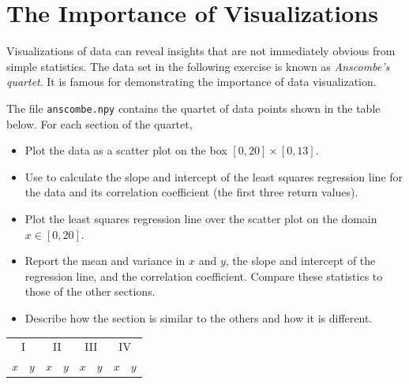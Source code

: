 \label{lab:DataVis}

\section*{The Importance of Visualizations} %

Visualizations of data can reveal insights that are not immediately obvious from simple statistics.
The data set in the following exercise is known as \emph{Anscombe's quartet}.
It is famous for demonstrating the importance of data visualization.

\begin{problem} %
The file \texttt{anscombe.npy} contains the quartet of data points shown in the table below.
For each section of the quartet,
\begin{itemize}
	\setlength\itemsep{0em}
	\item Plot the data as a scatter plot on the box $[0,20]\times[0,13]$.
    \item Use  to calculate the slope and intercept of the least squares regression line for the data and its correlation coefficient (the first three return values).
	\item Plot the least squares regression line over the scatter plot on the domain $x \in [0,20]$.
	\item Report the mean and variance in $x$ and $y$, the slope and intercept of the regression line, and the correlation coefficient.
    Compare these statistics to those of the other sections.
	\item Describe how the section is similar to the others and how it is different.
\end{itemize}
\begin{table}[H]
\scriptsize{
\begin{tabular}{rr|rr|rr|rr}
    \multicolumn{2}{c|}{I}    & \multicolumn{2}{|c|}{II} &
    \multicolumn{2}{|c|}{III} & \multicolumn{2}{|c}{IV} \\
    \multicolumn{1}{c}{$x$}   & \multicolumn{1}{c|}{$y$} &
    \multicolumn{1}{|c}{$x$}  & \multicolumn{1}{c|}{$y$} &
    \multicolumn{1}{|c}{$x$}  & \multicolumn{1}{c|}{$y$} &
    \multicolumn{1}{|c}{$x$}  & \multicolumn{1}{c}{$y$} \\

\end{tabular}}
\end{table}
\end{problem}
